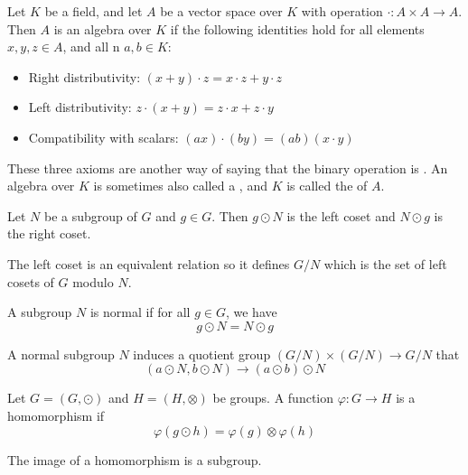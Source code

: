 \begin{definition}
    Let $K$ be a field, and let $A$ be a vector space over $K$ with operation $\cdot : A \times A \rightarrow A$. Then $A$ is an algebra over $K$ if the following identities hold for all elements $x,y,z \in A$, and all n $a,b \in K$:
    \begin{itemize}
        \item Right distributivity: $(x+y) \cdot z = x \cdot z + y \cdot z$
        \item Left distributivity: $z \cdot (x+y) = z \cdot x + z \cdot y$
        \item Compatibility with scalars: $(ax) \cdot (by) = (ab) (x \cdot y)$
    \end{itemize}

    These three axioms are another way of saying that the binary operation is . An algebra over $K$ is sometimes also called a , and $K$ is called the  of $A$.
\end{definition}

\begin{definition}
    Let $N$ be a subgroup of $G$ and $g \in G$. Then $g \odot N$ is the left coset and $N \odot g$ is the right coset.
    
    The left coset is an equivalent relation so it defines $G/N$ which is the set of left cosets of $G$ modulo $N$.
\end{definition}

\begin{definition}
    A subgroup $N$ is normal if for all $g \in G$, we have 
    \begin{equation}
        g \odot N = N \odot g
    \end{equation}    
\end{definition}

\begin{definition}
    A normal subgroup $N$ induces a quotient group $(G/N) \times (G/N) \rightarrow G/N$ that 
    \begin{equation}
        (a \odot N, b \odot N) \rightarrow (a \odot b) \odot N
    \end{equation} 
\end{definition}

\begin{definition}
    Let $G = (G, \odot)$ and $H = (H, \otimes)$ be groups. A function $\varphi: G \rightarrow H$ is a homomorphism if 
    \begin{equation}
        \varphi(g \odot h) = \varphi(g) \otimes \varphi(h)
    \end{equation}
    
    The image of a homomorphism is a subgroup.
\end{definition}


